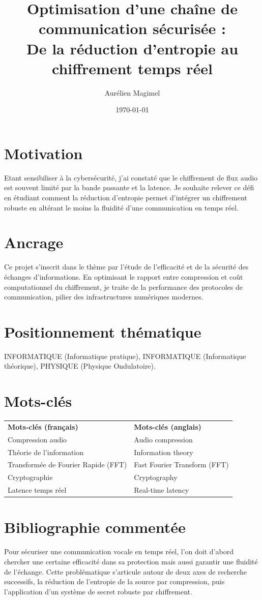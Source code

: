 \documentclass[11pt]{article}
\title{\textbf{Optimisation d'une chaîne de communication sécurisée : \\ De la réduction d'entropie au chiffrement temps réel}}
\author{Aurélien Magimel}
\date{\today}
\begin{document}
\maketitle

\section*{Motivation}
Etant sensibiliser à la cybersécurité, j'ai constaté que le chiffrement de flux audio est souvent limité par la bande passante et la latence. Je souhaite relever ce défi en étudiant comment la réduction d'entropie permet d'intégrer un chiffrement robuste en altérant le moins la fluidité d'une communication en temps réel.

\section*{Ancrage}
Ce projet s'inscrit dans le thème par l'étude de l'efficacité et de la sécurité des échanges d'informations. En optimisant le rapport entre compression et coût computationnel du chiffrement, je traite de la performance des protocoles de communication, pilier des infrastructures numériques modernes.

\section*{Positionnement thématique}
 INFORMATIQUE (Informatique pratique), INFORMATIQUE (Informatique théorique), PHYSIQUE (Physique Ondulatoire).

\section*{Mots-clés}
\begin{tabular*}{\textwidth}{@{\extracolsep{\fill}}ll}
    \textbf{Mots-clés (français)} & \textbf{Mots-clés (anglais)} \\
    Compression audio & Audio compression \\
    Théorie de l'information & Information theory \\
    Transformée de Fourier Rapide (FFT) & Fast Fourier Transform (FFT) \\
    Cryptographie & Cryptography \\
    Latence temps réel & Real-time latency \\
\end{tabular*}

\section*{Bibliographie commentée}
Pour sécuriser une communication vocale en temps réel, l'on doit d'abord chercher une certaine efficacité dans sa protection mais aussi garantir une fluidité de l'échange. Cette problématique s'articule autour de deux axes de recherche successifs, la réduction de l'entropie de la source par compression, puis l'application d'un système de secret robuste par chiffrement.
\end{document}
